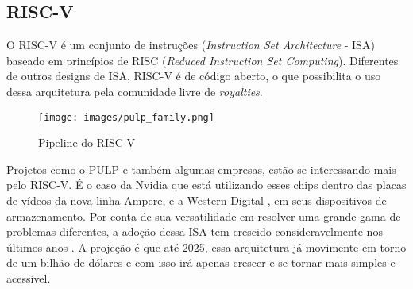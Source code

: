 \subsection{RISC-V}

O RISC-V \cite{RISCV_Org} é um conjunto de instruções (\textit{Instruction Set Architecture} - ISA) baseado em princípios de RISC (\textit{Reduced Instruction Set Computing}). 
Diferentes de outros designs de ISA, RISC-V é de código aberto, o que possibilita o uso dessa arquitetura pela comunidade livre de \textit{royalties}.

    \begin{figure}[h!]
        \centering
        \texttt{[image: images/pulp\_family.png]}
        \caption{Pipeline do RISC-V \\ \cite{PULP-Plataform} } %
    \end{figure}

Projetos como o PULP \cite{PULP-Plataform} e também algumas empresas, estão se interessando mais pelo RISC-V. É o caso da Nvidia \cite{Nvidia_Riscv} que 
está utilizando esses chips dentro das placas de vídeos da nova linha Ampere, e a Western Digital \cite{WesternDigital_Riscv}, 
em seus dispositivos de armazenamento. Por conta de sua versatilidade em resolver uma grande gama de problemas diferentes, 
a adoção dessa ISA tem crescido consideravelmente nos últimos anos \cite{RISCV_growth}. A projeção é que até 2025, essa 
arquitetura já movimente em torno de um bilhão de dólares \cite{RISCV_market_growth} e com isso irá apenas crescer e se 
tornar mais simples e acessível.
